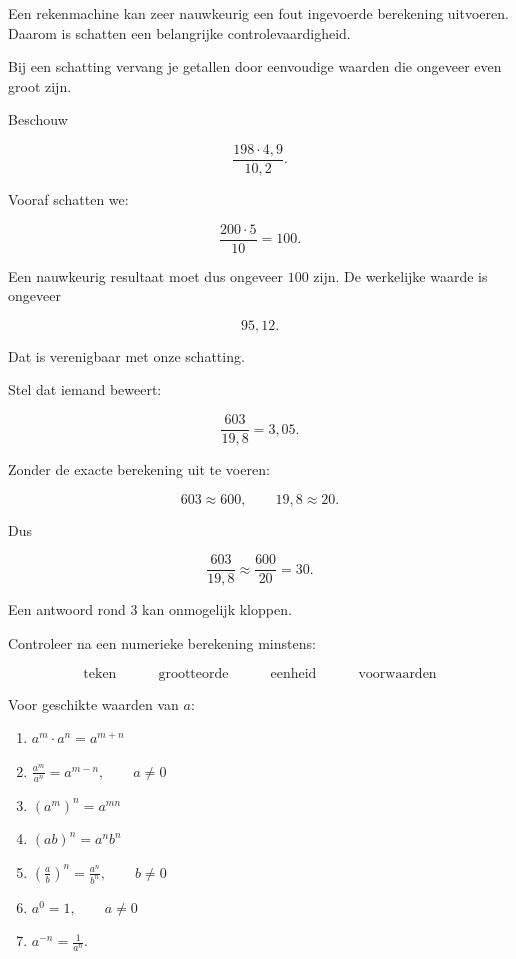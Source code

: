 \documentclass{ximera}
\begin{document}
Een rekenmachine kan zeer nauwkeurig een fout ingevoerde berekening uitvoeren.
Daarom is schatten een belangrijke controlevaardigheid.

Bij een schatting vervang je getallen door eenvoudige waarden die ongeveer even groot zijn.

\begin{voorbeeld}
Beschouw

\[
\frac{198\cdot4{,}9}{10{,}2}.
\]

Vooraf schatten we:

\[
\frac{200\cdot5}{10}=100.
\]

Een nauwkeurig resultaat moet dus ongeveer \(100\) zijn.
De werkelijke waarde is ongeveer

\[
95{,}12.
\]

Dat is verenigbaar met onze schatting.
\end{voorbeeld}



Stel dat iemand beweert:

\[
\frac{603}{19{,}8}=3{,}05.
\]

Zonder de exacte berekening uit te voeren:

\[
603\approx600,
\qquad
19{,}8\approx20.
\]

Dus

\[
\frac{603}{19{,}8}
\approx
\frac{600}{20}
=
30.
\]

Een antwoord rond \(3\) kan onmogelijk kloppen.

\begin{opmerking}
Controleer na een numerieke berekening minstens:

\[
\boxed{
\text{teken}
\quad \quad \quad
\text{grootteorde}
\quad \quad \quad
\text{eenheid}
\quad \quad \quad
\text{voorwaarden}
}
\]
\end{opmerking}



Voor geschikte waarden van \(a\):
\begin{eigenschap}
\begin{enumerate}
  \item \(
    a^m\cdot a^n=a^{m+n}
    \)
  \item \(
    \frac{a^m}{a^n}=a^{m-n},
    \qquad a\neq0
    \)
    \item \((a^m)^n=a^{mn}\)
    \item \((ab)^n=a^nb^n\)
    \item \(
      \left(\frac ab\right)^n
      =
      \frac{a^n}{b^n},
      \qquad b\neq0
      \)
      \item \( a^0=1,
      \qquad a\neq0 \)
      \item \( a^{-n}=\frac1{a^n}.
        \)
\end{enumerate}


\end{eigenschap}
\end{document}
